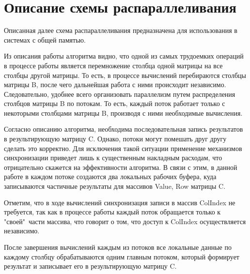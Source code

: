 \documentclass{report}
\begin{document}
\section*{Описание схемы распараллеливания}
\par Описанная далее схема распараллеливания предназначена для использования в системах с общей памятью.
\par Из описания работы алгоритма видно, что одной из самых трудоемких операций в процессе работы является перемножение столбца одной матрицы на все столбцы другой матрицы. То есть, в процессе вычислений перебираются столбцы матрицы B, после чего дальнейшая работа с ними происходит независимо. Следовательно, удобнее всего организовать параллелизм путем распределения столбцов матрицы B по потокам. То есть, каждый поток работает только с  некоторыми столбцами матрицы B, производя с ними необходимые вычисления. 
\par Согласно описанию алгоритма, необходима последовательная запись результатов в результирующую матрицу C. Однако, потоки могут помешать друг другу сделать это корректно. Для исключения такой ситуации применение механизмов синхронизации приведет лишь к существенным накладным расходам, что отрицательно скажется на эффективности алгоритма. В связи с этим, в данной работе в каждом потоке создаются два локальных рабочих буфера, куда записываются частичные результаты для массивов Value, Row матрицы C. 
\par Отметим, что в ходе вычислений синхронизация записи в массив ColIndex не требуется, так как в процессе работы каждый поток обращается только к "своей"\ части массива, что говорит о том, что доступ к ColIndex осуществляется независимо.
\par После завершения вычислений каждым из потоков все локальные данные по каждому столбцу обрабатываются одним главным потоком, который формирует результат и записывает его в результирующую матрицу C.
\newpage
\end{document}
